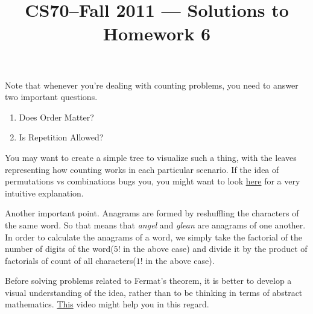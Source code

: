 \documentclass[11pt]{article}
\title{CS70--Fall 2011 --- Solutions to Homework 6}
\date{}
\begin{document}
	\maketitle
	
	Note that whenever you're dealing with counting problems, you need to answer two important questions. 
	\begin{enumerate}
		\item  Does Order Matter?
		\item  Is Repetition Allowed?
	\end{enumerate}
	
	You may want to create a simple tree to visualize such a thing, with the leaves representing how counting works in each particular scenario. If the idea of permutations vs combinations bugs you, you might want to look  \href{https://www.mathsisfun.com/combinatorics/combinations-permutations.html}{here} for a very intuitive explanation.
	
	Another important point. Anagrams are formed by reshuffling the characters of the same word. So that means that \textit{angel} and \textit{glean} are anagrams of one another. In order to calculate the anagrams of a word, we simply take the factorial of the number of digits of the word($5!$ in the above case) and divide it by the product of factorials of count of all characters($1!$ in the above case).
	
	Before solving problems related to Fermat's theorem, it is better to develop a visual understanding of the idea, rather than to be thinking in terms of abstract mathematics. \href{https://www.youtube.com/watch?v=XPMzosLWGHo}{This} video might help you in this regard. 
	
\end{document}
